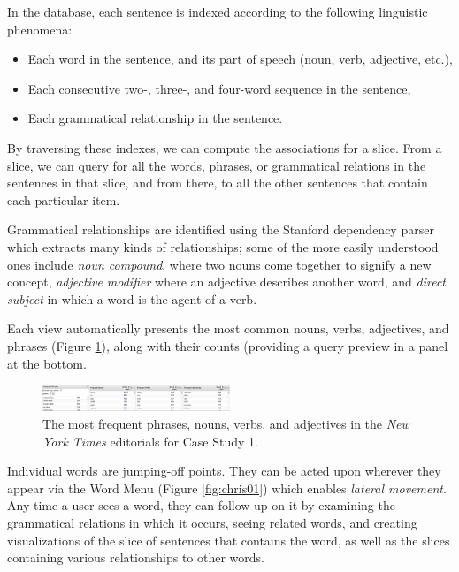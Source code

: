 \documentclass{sig-alternate}
\begin{document}
 In the database, each sentence is indexed according to the following linguistic phenomena:
\begin{itemize}
  \item Each word in the sentence, and its part of speech (noun, verb, adjective, etc.),
  \item Each consecutive two-, three-, and four-word sequence in the sentence,
  \item Each grammatical relationship in the sentence. 
  \end{itemize}  
 By traversing these indexes, we can compute the associations for a slice. From a slice, we can query for all the words, phrases, or grammatical relations in the sentences in that slice, and from there, to all the other sentences that contain each particular item.  

 Grammatical relationships are identified using the Stanford dependency parser\cite{klein_accurate_2003} which extracts many kinds of relationships; some of the more easily understood ones include \emph{noun compound}, where two nouns come together to signify a new concept, \emph{adjective modifier} where an adjective describes another word, and \emph{direct subject} in which a word is the agent of a verb. 

Each view automatically presents the most common nouns, verbs, adjectives, and phrases (Figure \ref{fig:intro06}),  along with their counts (providing a query preview \cite{donn_query_1996} in a panel at the bottom.    
\begin{figure}[ht!]
\begin{center}
	\includegraphics[width=0.5\textwidth]{fig/intro/06.png}
\end{center}
    \caption{%
       The most frequent phrases, nouns, verbs, and adjectives in the \emph{New York Times} editorials for Case Study 1.  \label{fig:intro06}
     }%
\end{figure}

Individual words are jumping-off points. They can be acted upon wherever they appear via the Word Menu (Figure \ref{fig:chris01}) which enables  \emph{lateral movement}.  Any time a user sees a word, they can follow up on it by examining the grammatical relations in which it occurs, seeing related words,  and creating visualizations of the slice of sentences that contains the word, as well as the slices containing various relationships to other words.
\end{document}
